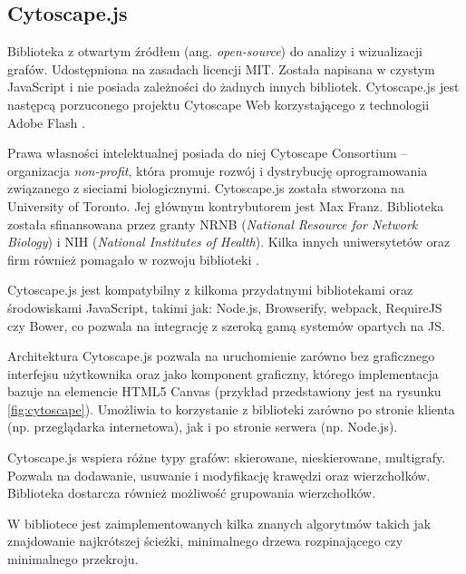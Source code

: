 \subsection{Cytoscape.js}

Biblioteka z otwartym źródłem (ang. \textit{open-source}) do analizy i wizualizacji grafów. Udostępniona na zasadach licencji MIT. Została napisana w czystym JavaScript i nie posiada zależności do żadnych innych bibliotek. Cytoscape.js jest następcą porzuconego projektu Cytoscape Web korzystającego z technologii Adobe Flash \cite[309]{franz}. 

Prawa własności intelektualnej posiada do niej Cytoscape Consortium -- organizacja \textit{non-profit}, która promuje rozwój i dystrybucję oprogramowania związanego z sieciami biologicznymi. Cytoscape.js została stworzona na University of Toronto. Jej głównym kontrybutorem jest Max Franz. Biblioteka została sfinansowana przez granty NRNB (\textit{National Resource for Network Biology}) i NIH (\textit{National Institutes of Health}). Kilka innych uniwersytetów oraz firm również pomagało w rozwoju biblioteki \cite{cytoscape}. 

Cytoscape.js jest kompatybilny z kilkoma przydatnymi bibliotekami oraz środowiskami JavaScript, takimi jak: Node.js, Browserify, webpack, RequireJS czy Bower, co pozwala na integrację z szeroką gamą systemów opartych na JS. 

Architektura Cytoscape.js pozwala na uruchomienie zarówno bez graficznego interfejsu użytkownika oraz jako komponent graficzny, którego implementacja bazuje na elemencie HTML5 Canvas (przykład przedstawiony jest na rysunku \ref{fig:cytoscape}). Umożliwia to korzystanie z biblioteki zarówno po stronie klienta (np. przeglądarka internetowa), jak i po stronie serwera (np. Node.js).

Cytoscape.js wspiera różne typy grafów: skierowane, nieskierowane, multigrafy. Pozwala na dodawanie, usuwanie i modyfikację krawędzi oraz wierzchołków. Biblioteka dostarcza również możliwość grupowania wierzchołków.

W bibliotece jest zaimplementowanych kilka znanych algorytmów takich jak znajdowanie najkrótszej ścieżki, minimalnego drzewa rozpinającego czy minimalnego przekroju. 

